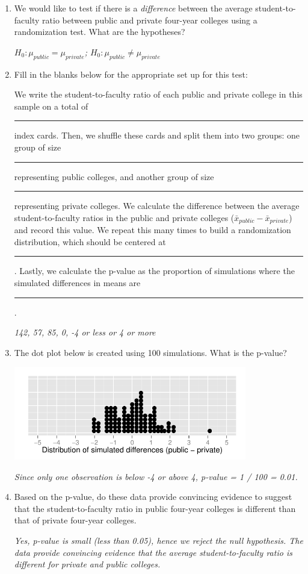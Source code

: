 \documentclass[12pt]{article}
\newcommand{\soln}[2]{\textit{\textcolor{custom_red}{#2}}}{}
\begin{document}
\begin{enumerate}

\item We would like to test if there is a \emph{difference} between the average student-to-faculty ratio between public and private four-year colleges using a randomization test. What are the hypotheses?

\soln{0.5cm}{$H_0: \mu_{public} = \mu_{private}$; $H_0: \mu_{public} \ne \mu_{private}$}

\item Fill in the blanks below for the appropriate set up for this test:

\begin{doublespace}
We write the student-to-faculty ratio of each public and private college in this sample on a total of \rule{2cm}{0.5pt} index cards. Then, we shuffle these cards and split them into two groups: one group of size \rule{2cm}{0.5pt} representing public colleges, and another group of size \rule{2cm}{0.5pt} representing private colleges. We calculate the difference between the average student-to-faculty ratios in the public and private colleges ($\bar{x}_{public} - \bar{x}_{private}$) and record this value. We repeat this many times to build a randomization distribution, which should be centered at \rule{2cm}{0.5pt} . Lastly, we calculate the p-value as the proportion of simulations where the simulated differences in means are \rule{5cm}{0.5pt}.
\end{doublespace}

\soln{0cm}{142, 57, 85, 0, -4 or less or 4 or more}

\pagebreak

\item The dot plot below is created using 100 simulations. What is the p-value?

\begin{center}
\includegraphics[width=0.8\textwidth]{ratio/rand_dist_dot.pdf}
\end{center}

\soln{0.2cm}{Since only one observation is below -4 or above 4, p-value = 1 / 100 = 0.01.}

\item Based on the p-value, do these data provide convincing evidence to suggest that the student-to-faculty ratio in public four-year colleges is different than that of private four-year colleges.

\soln{1cm}{Yes, p-value is small (less than 0.05), hence we reject the null hypothesis. The data provide convincing evidence that the average student-to-faculty ratio is different for private and public colleges.}

\end{enumerate}
\end{document}
